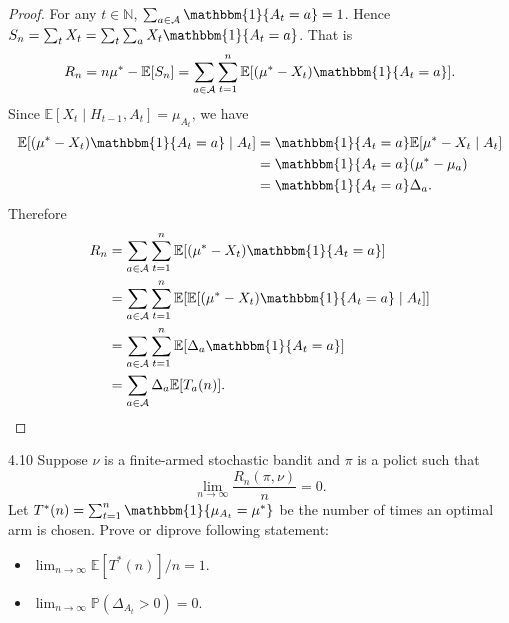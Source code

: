 \documentclass[10pt]{article}
\theoremstyle{definition}
\newenvironment{exercise*}[1]{%
  \IfBlankTF{#1}
    {\renewcommand{\themanualexerciseinner}{\unskip}}
    {\renewcommand\themanualexerciseinner{#1}}%
  \manualexerciseinner
}{\endmanualexerciseinner}
\begin{document}
\begin{proof}
    For any $t \in \mathbb{N}$, $\sum_{a \in \mathcal{A}} \mathbbm{1}\{A_t = a\} = 1$. Hence $S_n = \sum_t X_t = \sum_t \sum_a X_t \mathbbm{1}\{A_t = a\}$.
    That is
    \begin{equation*}
        R_n = n \mu^* - \mathbb{E} [S_n] = \sum_{a \in \mathcal{A}} \sum_{t=1}^n \mathbb{E} [( \mu^* - X_t) \mathbbm{1}\{ A_t = a \}].
    \end{equation*}
    Since $\mathbb{E} [X_t \mid H_{t-1}, A_t] = \mu_{A_t}$, we have
    \begin{align*}
        \mathbb{E}[(\mu^* - X_t) \mathbbm{1}\{A_t = a\} \mid A_t] &= \mathbbm{1}\{A_t = a\} \mathbb{E}[\mu^* - X_t \mid A_t] \\
        &= \mathbbm{1}\{A_t = a\} (\mu^* - \mu_a) \\
        &= \mathbbm{1}\{A_t = a\} \Delta_a.
    \end{align*}
    Therefore
    \begin{align*}
        R_n &= \sum_{a \in \mathcal{A}} \sum_{t=1}^n \mathbb{E}[(\mu^* - X_t) \mathbbm{1}\{A_t = a\}] \\
            &= \sum_{a \in \mathcal{A}} \sum_{t=1}^n \mathbb{E}[\mathbb{E}[(\mu^* - X_t) \mathbbm{1}\{A_t = a\} \mid A_t]] \\
            &= \sum_{a \in \mathcal{A}} \sum_{t=1}^n \mathbb{E}[\Delta_a \mathbbm{1}\{A_t = a\}] \\
            &= \sum_{a \in \mathcal{A}} \Delta_a \mathbb{E}[T_a(n)].
    \end{align*}
\end{proof}

\begin{exercise*}{4.10}
    Suppose $\nu$ is a finite-armed stochastic bandit and $\pi$ is a polict such that
    \begin{equation*}
        \lim_{n \to \infty} \frac{R_n(\pi, \nu)}{n} = 0.
    \end{equation*}
    Let $T^*(n) = \sum_{t=1}^n \mathbbm{1}\{\mu_{A_t} = \mu^*\}$ be the number of times an optimal arm is chosen.
    Prove or diprove following statement:
    \begin{itemize}
        \item[(a)] $\lim_{n \rightarrow \infty} \mathbb{E}[T^* (n)]/n = 1$.
        \item[(b)] $\lim_{n \rightarrow \infty} \mathbb{P}(\Delta_{A_t} > 0) = 0$.
    \end{itemize}
\end{exercise*}
\end{document}
